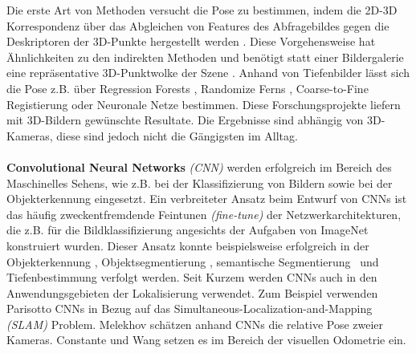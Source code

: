 Die erste Art von Methoden versucht die Pose zu bestimmen, indem die 2D-3D Korrespondenz über das Abgleichen von Features des Abfragebildes gegen die Deskriptoren der 3D-Punkte hergestellt werden \cite{irscharaStructurefrommotionPointClouds2009, liWorldwidePoseEstimation2012, svarmCityScaleLocalizationCameras2017}. Diese Vorgehensweise hat Ähnlichkeiten zu den indirekten Methoden und benötigt statt einer Bildergalerie eine repräsentative 3D-Punktwolke der Szene \cite{piascoSurveyVisualBasedLocalization2018}. Anhand von Tiefenbilder lässt sich die Pose z.B. über Regression Forests \cite{shottonSceneCoordinateRegression2013a}, Randomize Ferns \cite{glockerRealTimeRGBDCamera2015}, Coarse-to-Fine Registierung \cite{santosMappingIndoorSpaces2016} oder Neuronale Netze \cite{massicetiRandomForestsNeural2016} bestimmen. Diese Forschungsprojekte liefern mit 3D-Bildern gewünschte Resultate. Die Ergebnisse sind abhängig von 3D-Kameras, diese sind jedoch nicht die Gängigsten im Alltag.
\\\\
\textbf{Convolutional Neural Networks} \textit{(CNN)} werden erfolgreich im Bereich des Maschinelles Sehens, wie z.B. bei der Klassifizierung von Bildern \cite{krizhevskyImageNetClassificationDeep2012, simonyanVeryDeepConvolutional2014, heDeepResidualLearning2015} sowie bei der Objekterkennung \cite{girshickRichFeatureHierarchies2013, renFasterRCNNRealTime2015b, girshickFastRCNN2015} eingesetzt. 
Ein verbreiteter Ansatz beim Entwurf von CNNs ist das häufig zweckentfremdende Feintunen \textit{(fine-tune)} der Netzwerkarchitekturen, die z.B. für die Bildklassifizierung angesichts der Aufgaben von ImageNet \cite{russakovskyImageNetLargeScale2014} konstruiert wurden. Dieser Ansatz konnte beispielsweise erfolgreich in der Objekterkennung \cite{girshickFastRCNN2015}, Objektsegmentierung \cite{kokkinosPushingBoundariesBoundary2015, maninisConvolutionalOrientedBoundaries2016}, semantische Segmentierung \cite{nohLearningDeconvolutionNetwork2015, hazirbasFuseNetIncorporatingDepth2017a} und Tiefenbestimmung \cite{liDepthSurfaceNormal2015} verfolgt werden.
Seit Kurzem werden CNNs auch in den Anwendungsgebieten der Lokalisierung verwendet. Zum Beispiel verwenden Parisotto \etal\cite{parisottoGlobalPoseEstimation2018} CNNs in Bezug auf das Simultaneous-Localization-and-Mapping \textit{(SLAM)} Problem. Melekhov \etal\cite{melekhovRelativeCameraPose2017} schätzen anhand CNNs die relative Pose zweier Kameras. Constante \etal\cite{costanteExploringRepresentationLearning2016} und Wang \etal\cite{wangDeepVOEndtoendVisual2017} setzen es im Bereich der visuellen Odometrie ein.

